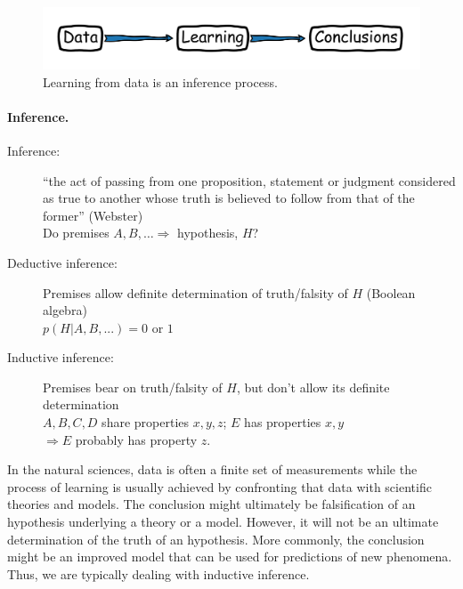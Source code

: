 \documentclass[%
oneside,                 %
final,                   %
10pt]{article}
\newenvironment{block_mdfboxadmon}[1][]{
\begin{block_mdfboxmdframed}[frametitle=#1]
}
{
\end{block_mdfboxmdframed}
}
\begin{document}
\begin{figure}[!ht]  %
  \centerline{\includegraphics[width=0.8\linewidth]{fig/inference.png}}
  \caption{
  Learning from data is an inference process. \label{fig-inference}
  }
\end{figure}


\paragraph{Inference.}

\begin{block_mdfboxadmon}[]
\begin{description}
\item[Inference:] 
  ``the act of passing from one proposition, statement or judgment considered as true to another whose truth is believed to follow from that of the former'' (Webster) \\
  Do premises $A, B, \ldots \Rightarrow$ hypothesis, $H$? 

\item[Deductive inference:] 
  Premises allow definite determination of truth/falsity of $H$ (Boolean algebra) \\
  $p(H|A,B,...) = 0$ or $1$

\item[Inductive inference:] 
  Premises bear on truth/falsity of $H$, but don’t allow its definite determination\\
  $A, B, C, D$ share properties $x, y, z$; $E$ has properties $x, y$\\
  $\Rightarrow E$ probably has property $z$.
\end{description}

\noindent
\end{block_mdfboxadmon} %



In the natural sciences, data is often a finite set of measurements while the process of learning is usually achieved by confronting that data with scientific theories and models. The conclusion might ultimately be falsification of an hypothesis underlying a theory or a model. However, it will not be an ultimate determination of the truth of an hypothesis. More commonly, the conclusion might be an improved model that can be used for predictions of new phenomena. Thus, we are typically dealing with inductive inference.
\end{document}
